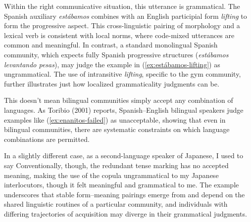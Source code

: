  \label{ex:estábamos-lifting}
\z
Within the right communicative situation, this utterance is grammatical. The Spanish auxiliary \textit{estábamos} combines with an English participial form \textit{lifting} to form the progressive aspect. This cross-linguistic pairing of morphology and a lexical verb is consistent with local norms, where code-mixed utterances are common and meaningful. In contrast, a standard monolingual Spanish community, which expects fully Spanish progressive structures (\textit{estábamos levantando pesas}), may judge the example in (\ref{ex:estábamos-lifting}) as ungrammatical. The use of intransitive \textit{lifting}, specific to the gym community, further illustrates just how localized grammaticality judgments can be.

This doesn't mean bilingual communities simply accept any combination of languages. As Toribio (2001) reports, Spanish--English bilingual speakers judge examples like (\ref{ex:enanitos-failed}) as unacceptable, showing that even in bilingual communities, there are systematic constraints on which language combinations are permitted.

\label{ex:enanitos-failed}
\z

In a slightly different case, as a second-language speaker of Japanese, I used to say
\z
Conventionally, though, the redundant tense marking has no accepted meaning, making the use of the copula ungrammatical to my Japanese interlocutors, though it felt meaningful and grammatical to me. The example underscores that stable form--meaning pairings emerge from and depend on the shared linguistic routines of a particular community, and individuals with differing trajectories of acquisition may diverge in their grammatical judgments.

